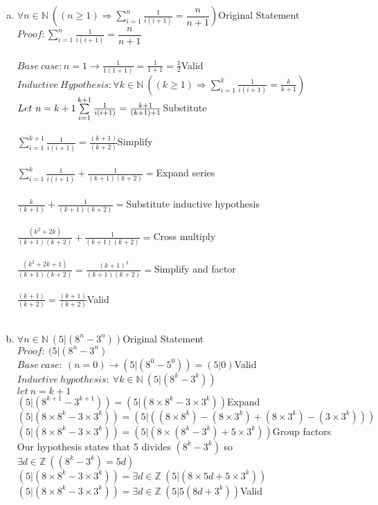 \documentclass[11pt,letterpaper]{article}
\begin{document}
\clearpage

\begin{enumerate}[(a)]
\item
$\forall n\in\mathbb{N}~((n\geq 1)\Rightarrow\sum\limits_{i=1}^n\frac{1}{i(i+1)} = \dfrac{n}{n+1})$\hfill Original Statement\\
$Proof: \sum\limits_{i=1}^n\frac{1}{i(i+1)} = \dfrac{n}{n+1} $\\
\\
$Base~case:n=1\rightarrow\frac{1}{1(1+1)}=\frac{1}{1+1} = \frac{1}{2}$\hfill Valid\\
$Inductive~ Hypothesis: \forall k\in\mathbb{N}~((k\geq 1)\Rightarrow\sum\limits_{i=1}^k\frac{1}{i(i+1)} = \frac{k}{k+1})$\\
$Let~ n=k+1\\
\\
\sum\limits_{i=1}^{k+1}\frac{1}{i(i+1)} = \frac{k+1}{(k+1)+1}$\hfill Substitute\\
\\
$\sum\limits_{i=1}^{k+1}\frac{1}{i(i+1)} = \frac{(k+1)}{(k+2)}$\hfill Simplify\\
\\
$\sum\limits_{i=1}^{k}\frac{1}{i(i+1)} + \frac{1}{(k+1)(k+2)}= $\hfill Expand series\\
\\
$\frac{k}{(k+1)} + \frac{1}{(k+1)(k+2)}= $\hfill Substitute inductive hypothesis\\
\\
$\frac{(k^2+2k)}{(k+1)(k+2)} + \frac{1}{(k+1)(k+2)}= $\hfill Cross multiply\\
\\
$\frac{(k^2+2k + 1)}{(k+1)(k+2)} = \frac{(k+1)^2}{(k+1)(k+2)}=$\hfill Simplify and factor\\
\\
$\frac{(k+1)}{(k+2)} =\frac{(k+1)}{(k+2)}$\hfill Valid\\
\\
\item
$\forall n\in\mathbb{N}~(5|(8^n - 3^n))$\hfill Original Statement\\
$Proof: ~(5|(8^n - 3^n)$\\
$Base~case:~(n=0)\rightarrow(5|(8^0-5^0))= (5|0)$\hfill Valid\\
$Inductive~hypothesis:~\forall k\in\mathbb{N}~(5|(8^k - 3^k))$\\
$let ~n =k+1$\\
$(5|(8^{k+1} - 3^{k+1}))= (5|(8\times 8^{k} - 3\times 3^{k}))$\hfill Expand\\
$(5|(8\times 8^{k} - 3\times 3^{k}))= (5|((8\times 8^{k}) - (8\times 3^{k}) +(8\times 3^{k})- (3\times 3^{k})))$\\
$(5|(8\times 8^{k} - 3\times 3^{k}))= (5|(8\times (8^k -3^{k}) +5\times 3^{k}))$\hfill Group factors\\
Our hypothesis states that 5 divides $(8^k - 3^k)$ so $\exists d\in\mathbb{Z}~((8^k-3^k)=5d)$\\
$(5|(8\times 8^{k} - 3\times 3^{k}))= \exists d\in\mathbb{Z}~(5|(8\times 5d +5\times 3^{k}))$\\
$(5|(8\times 8^{k} - 3\times 3^{k}))= \exists d\in\mathbb{Z}~(5|5(8d + 3^{k}))$\hfill Valid\\


\end{enumerate}
\end{document}
